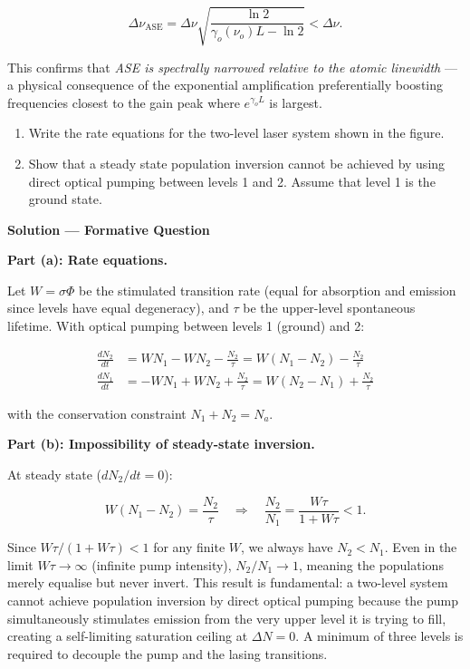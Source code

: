 \begin{equation*}
  \Delta\nu_{\text{ASE}} = \Delta\nu\sqrt{\frac{\ln 2}{\gamma_o(\nu_o)L - \ln 2}} < \Delta\nu.
\end{equation*}

This confirms that \emph{ASE is spectrally narrowed relative to the atomic linewidth} --- a physical consequence of the exponential amplification preferentially boosting frequencies closest to the gain peak where $e^{\gamma_o L}$ is largest.


\begin{question}\begin{enumerate}[label=(\alph*)]
  \item Write the rate equations for the two-level laser system shown in the figure.
  \item Show that a steady state population inversion cannot be achieved by using direct
        optical pumping between levels 1 and 2. Assume that level 1 is the ground state.
\end{enumerate}
\end{question}

\textbf{\large Solution --- Formative Question}

\textbf{Part (a): Rate equations.}

Let $W = \sigma\Phi$ be the stimulated transition rate (equal for absorption and emission since levels have equal degeneracy), and $\tau$ be the upper-level spontaneous lifetime. With optical pumping between levels 1 (ground) and 2:

\begin{align*}
  \frac{dN_2}{dt} &= W N_1 - W N_2 - \frac{N_2}{\tau} = W(N_1 - N_2) - \frac{N_2}{\tau}\\[1ex]
  \frac{dN_1}{dt} &= -W N_1 + W N_2 + \frac{N_2}{\tau} = W(N_2 - N_1) + \frac{N_2}{\tau}
\end{align*}

with the conservation constraint $N_1 + N_2 = N_a$.

\textbf{Part (b): Impossibility of steady-state inversion.}

At steady state ($dN_2/dt = 0$):

\begin{equation*}
  W(N_1 - N_2) = \frac{N_2}{\tau}
  \quad\Longrightarrow\quad
  \frac{N_2}{N_1} = \frac{W\tau}{1 + W\tau} < 1.
\end{equation*}

Since $W\tau/(1+W\tau) < 1$ for any finite $W$, we always have $N_2 < N_1$. Even in the limit $W\tau \to \infty$ (infinite pump intensity), $N_2/N_1 \to 1$, meaning the populations merely equalise but never invert. This result is fundamental: a two-level system cannot achieve population inversion by direct optical pumping because the pump simultaneously stimulates emission from the very upper level it is trying to fill, creating a self-limiting saturation ceiling at $\Delta N = 0$. A minimum of three levels is required to decouple the pump and the lasing transitions.
